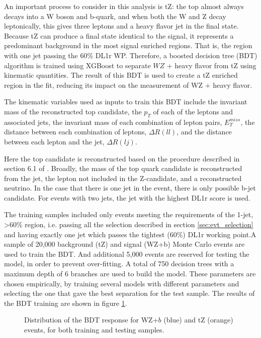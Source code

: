 

An important process to consider in this analysis is tZ: the top almost always decays into a W boson and b-quark, and when both the W and Z decay leptonically, this gives three leptons and a heavy flavor jet in the final state. Because tZ can produce a final state identical to the signal, it represents a predominant background in the most signal enriched regions. That is, the region with one jet passing the 60\% DL1r WP. Therefore, a boosted decision tree (BDT) algorithm is trained using XGBoost \cite{xgboost_cite} to separate $WZ$ + heavy flavor from tZ using kinematic quantities. The result of this BDT is used to create a tZ enriched region in the fit, reducing its impact on the measurement of WZ + heavy flavor.

The kinematic variables used as inputs to train this BDT include the invariant mass of the reconstructed top candidate, the $p_T$ of each of the leptons and associated jets, the  invariant mass of each combination of lepton pairs, $E_T^{miss}$, the distance between each combination of leptons, $\Delta R (ll)$, and the distance between each lepton and the jet, $\Delta R (lj)$.

Here the top candidate is reconstructed based on the procedure described in section 6.1 of \cite{ttZ_paper}. Broadly, the mass of the top quark candidate is reconstructed from the jet, the lepton not included in the Z-candidate, and a reconstructed neutrino. In the case that there is one jet in the event, there is only possible b-jet candidate. For events with two jets, the jet with the highest DL1r score is used.
 
The training samples included only events meeting the requirements of the 1-jet, >60\% region, i.e. passing all the selection described in section \ref{sec:evt_selection} and having exactly one jet which passes the tightest (60\%) DL1r working point.A sample of 20,000 background (tZ) and signal (WZ+b) Monte Carlo events are used to train the BDT. And additional 5,000 events are reserved for testing the model, in order to prevent over-fitting. A total of 750 decision trees with a maximum depth of 6 branches are used to build the model. These parameters are chosen empirically, by training several models with different parameters and selecting the one that gave the best separation for the test sample. The results of the BDT training are shown in figure \ref{fig:tZ_bdt}. 
\begin{figure}[H] 
\center
    \caption{Distribution of the BDT response for WZ+$b$ (blue) and tZ (orange) events, for both training and testing samples.}
    \label{fig:tZ_bdt}
\end{figure}

